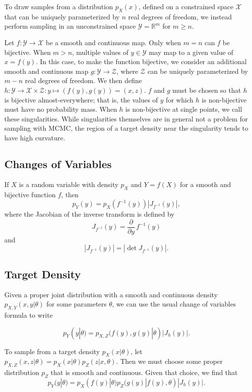 \documentclass[11pt]{article}
\newcommand{\abs}[1]{\left| #1 \right|}
\newcommand{\absdet}[1]{\abs{#1}}
\begin{document}
To draw samples from a distribution $p_X(x)$, defined on a constrained space $\mathcal{X}$ that can be uniquely parameterized by $n$ real degrees of freedom, we instead perform sampling in an unconstrained space $\mathcal{Y}=\mathbb{R}^m$ for $m \ge n$.

Let $f\colon \mathcal{Y} \to \mathcal{X}$ be a smooth and continuous map.
Only when $m = n$ can $f$ be bijective.
When $m > n$, multiple values of $y \in \mathcal{Y}$ may map to a given value of $x = f(y)$.
In this case, to make the function bijective, we consider an additional smooth and continuous map $g\colon \mathcal{Y} \to \mathcal{Z}$, where $\mathcal{Z}$ can be uniquely parameterized by $m - n$ real degrees of freedom.
We then define $h\colon \mathcal{Y} \to \mathcal{X} \times \mathcal{Z}: y \mapsto (f(y), g(y)) = (x, z)$.
$f$ and $g$ must be chosen so that $h$ is bijective almost-everywhere;
that is, the values of $y$ for which $h$ is non-bijective must have no probability mass.
When $h$ is non-bijective at single points, we call these singularities.
While singularities themselves are in general not a problem for sampling with MCMC, the region of a target density near the singularity tends to have high curvature.

\subsection{Changes of Variables}

If $X$ is a random variable with density $p_X$ and $Y = f(X)$ for a
smooth and bijective function $f$, then
\[
  p_Y(y) = p_X(f^{-1}(y)) \absdet{J_{f^{-1}}(y)},
\]
where the Jacobian of the inverse transform is defined by
\[
  J_{f^{-1}}(y) = \frac{\partial}{\partial y} \, f^{-1}(y)
\]
and
\[
  \absdet{J_{f^{-1}}(y)}
  = \abs{\det J_{f^{-1}}(y)}.
\]

\subsection{Target Density}
Given a proper joint distribution with a smooth and continuous density $p_{X,Y}(x, y | \theta)$ for some parameters $\theta$, we can use the usual change of variables formula to write

\[
  p_Y(y | \theta) = p_{X,Z}(f(y), g(y) | \theta) |J_h(y)|.
\]

To sample from a target density $p_X(x | \theta)$, let $p_{X,Z}(x, z | \theta) = p_X(x | \theta) p_Z(z | x, \theta)$.
Then we must choose some proper distribution $p_Z$ that is smooth and continuous.
Given that choice, we find that
\[
  p_Y(y | \theta) = p_X(f(y) | \theta) p_Z(g(y) | f(y), \theta) |J_h(y)|.
\]
\end{document}

